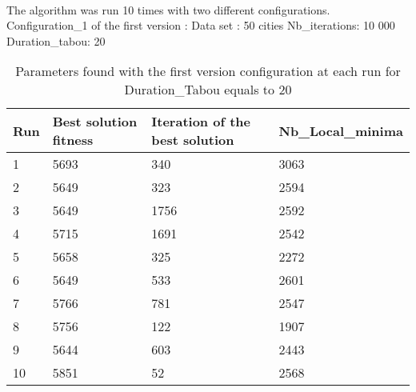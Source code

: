 \documentclass[12pt,oneside,a4paper]{article}
\begin{document}
\paragraph{}
The algorithm was run 10 times with two different configurations.
\newline
Configuration\_1 of the first version : 
\newline
Data set : 50 cities 
\newline
Nb\_iterations: 10 000 
\newline
Duration\_tabou: 20
\begin{table}[h]
    \centering
    \small
    \begin{tabular}{llll}
      \hline
      \multicolumn{1}{|l|}{\textbf{Run}}& \multicolumn{1}{l|}{\textbf{Best solution fitness}}& \multicolumn{1}{l|}{\textbf{Iteration of the best solution}}& \multicolumn{1}{l|}{\textbf{Nb\_Local\_minima}}\\ \hline
      \multicolumn{1}{|l|}{1} & \multicolumn{1}{l|}{5693}  & \multicolumn{1}{l|}{340} & \multicolumn{1}{l|}{3063}  \\ \hline
      \multicolumn{1}{|l|}{2} & \multicolumn{1}{l|}{5649}  & \multicolumn{1}{l|}{323} & \multicolumn{1}{l|}{2594}  \\ \hline         
      \multicolumn{1}{|l|}{3} & \multicolumn{1}{l|}{5649}  & \multicolumn{1}{l|}{1756}  & \multicolumn{1}{l|}{2592}  \\ \hline
      \multicolumn{1}{|l|}{4} & \multicolumn{1}{l|}{5715}  & \multicolumn{1}{l|}{1691}  & \multicolumn{1}{l|}{2542}  \\ \hline
      \multicolumn{1}{|l|}{5} & \multicolumn{1}{l|}{5658}  & \multicolumn{1}{l|}{325}  & \multicolumn{1}{l|}{2272}  \\ \hline
      \multicolumn{1}{|l|}{6} & \multicolumn{1}{l|}{5649}  & \multicolumn{1}{l|}{533}  & \multicolumn{1}{l|}{2601}  \\ \hline
      \multicolumn{1}{|l|}{7} & \multicolumn{1}{l|}{5766}  & \multicolumn{1}{l|}{781}  & \multicolumn{1}{l|}{2547}  \\ \hline
      \multicolumn{1}{|l|}{8} & \multicolumn{1}{l|}{5756}  & \multicolumn{1}{l|}{122} & \multicolumn{1}{l|}{1907}  \\ \hline
      \multicolumn{1}{|l|}{9} & \multicolumn{1}{l|}{5644}  & \multicolumn{1}{l|}{603} & \multicolumn{1}{l|}{2443}  \\ \hline
      \multicolumn{1}{|l|}{10} & \multicolumn{1}{l|}{5851}  & \multicolumn{1}{l|}{52} & \multicolumn{1}{l|}{2568}  \\ \hline
    \end{tabular}
    \caption{Parameters found with the first version configuration at each run for Duration\_Tabou equals to 20}
  \end{table}
\end{document}
